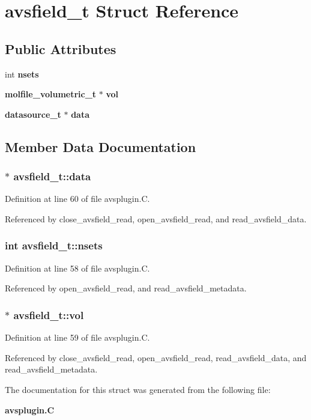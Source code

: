 \section{avsfield\_\-t  Struct Reference}
\label{structavsfield__t}
\subsection*{Public Attributes}
\begin{CompactItemize}
\item 
int {\bf nsets}
\item 
{\bf molfile\_\-volumetric\_\-t} $\ast$ {\bf vol}
\item 
{\bf datasource\_\-t} $\ast$ {\bf data}
\end{CompactItemize}


\subsection{Member Data Documentation}
\subsubsection{$\ast$ avsfield\_\-t::data}\label{structavsfield__t_m2}




Definition at line 60 of file avsplugin.C.

Referenced by close\_\-avsfield\_\-read, open\_\-avsfield\_\-read, and read\_\-avsfield\_\-data.
\subsubsection{\setlength{\rightskip}{0pt plus 5cm}int avsfield\_\-t::nsets}\label{structavsfield__t_m0}




Definition at line 58 of file avsplugin.C.

Referenced by open\_\-avsfield\_\-read, and read\_\-avsfield\_\-metadata.
\subsubsection{$\ast$ avsfield\_\-t::vol}\label{structavsfield__t_m1}




Definition at line 59 of file avsplugin.C.

Referenced by close\_\-avsfield\_\-read, open\_\-avsfield\_\-read, read\_\-avsfield\_\-data, and read\_\-avsfield\_\-metadata.

The documentation for this struct was generated from the following file:\begin{CompactItemize}
\item 
{\bf avsplugin.C}\end{CompactItemize}
